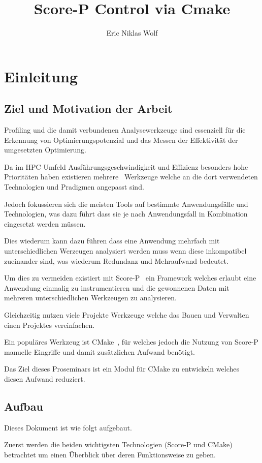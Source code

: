 \documentclass[german,proseminar,hyperref,utf8]{zihpub}
\author{Eric Niklas Wolf}
\title{Score-P Control via Cmake}
\begin{document}
    \section{Einleitung}
    \subsection{Ziel und Motivation der Arbeit}
    Profiling und die damit verbundenen Analysewerkzeuge sind essenziell für die Erkennung von
    Optimierungspotenzial und das Messen der Effektivität der umgesetzten Optimierung.

    Da im HPC Umfeld Ausführungsgeschwindigkeit und Effizienz besonders hohe Prioritäten haben existieren
    mehrere~ Werkzeuge welche an die dort verwendeten Technologien
    und Pradigmen angepasst sind.

    Jedoch fokussieren sich die meisten Tools auf bestimmte Anwendungsfälle und Technologien,
    was dazu führt dass sie je nach Anwendungsfall in Kombination eingesetzt werden müssen.

    Dies wiederum kann dazu führen dass eine Anwendung mehrfach mit unterschiedlichen Werzeugen
    analysiert werden muss wenn diese inkompatibel zueinander sind, was wiederum Redundanz
    und Mehraufwand bedeutet.

    Um dies zu vermeiden existiert mit Score-P~\cite{Score-P-Paper} ein Framework welches erlaubt
    eine Anwendung  einmalig zu instrumentieren und die gewonnenen Daten mit mehreren
    unterschiedlichen Werkzeugen zu analysieren.

    Gleichzeitig nutzen viele Projekte Werkzeuge welche das Bauen und Verwalten einen Projektes
    vereinfachen.

    Ein populäres Werkzeug ist CMake~\cite{CMake-Documentation}, für welches jedoch die Nutzung
    von Score-P manuelle Eingriffe und damit zusätzlichen Aufwand benötigt.

    Das Ziel dieses Proseminars ist ein Modul für CMake zu entwickeln welches diesen Aufwand
    reduziert.


    \subsection{Aufbau}
    Dieses Dokument ist wie folgt aufgebaut.

    Zuerst werden die beiden wichtigsten Technologien (Score-P und CMake) betrachtet um einen
    Überblick über deren Funktionsweise zu geben.
\end{document}
